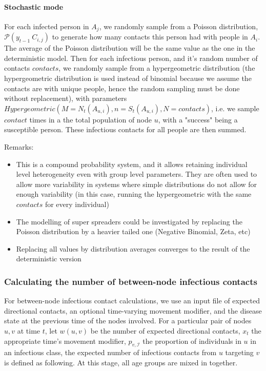 \documentclass[11pt]{article}
\begin{document}
\paragraph{Stochastic mode}\hfill \break
For each infected person in $A_j$, we randomly sample from a Poisson distribution, $\mathcal{P}(y_{t-1}~C_{i,j})$ to generate how many contacts this person had with people in $A_i$. The average of the Poisson distribution will be the same value as the one in the deterministic model. Then for each infectious person, and it's random number of contacts $contacts$, we randomly sample from a hypergeometric distribution (the hypergeometric distribution is used instead of binomial because we assume the contacts are with unique people, hence the random sampling must be done without replacement), with parameters $Hypergeometric(M=N_t(A_{u,i}), n=S_t(A_{u,i}), N=contacts)$, i.e. we sample $contact$ times in a the total population of node $u$, with a "success" being a susceptible person. These infectious contacts for all people are then summed.

Remarks:
\begin{itemize}
\item This is a compound probability system, and it allows retaining individual level heterogeneity even with group level parameters. They are often used to allow more variability in systems where simple distributions do not allow for enough variability (in this case, running the hypergeometric with the same $contacts$ for every individual)
\item The modelling of super spreaders could be investigated by replacing the Poisson distribution by a heavier tailed one (Negative Binomial, Zeta, etc)
\item Replacing all values by distribution averages converges to the result of the deterministic version
\end{itemize}

\subsubsection{Calculating the number of between-node infectious contacts}

For between-node infectious contact calculations, we use an input file of expected directional contacts, an optional time-varying movement modifier, and the disease state at the previous time of the nodes involved.  For a particular pair of nodes $u, v$ at time $t$, let $w(u, v)$ be the number of expected directional contacts, $x_t$ the appropriate time's movement modifier, $p_{v,\mathcal{I}}$ the proportion of individuals in $u$ in an infectious class, the expected number of infectious contacts from $u$ targeting $v$ is defined as following. At this stage, all age groups are mixed in together.
\end{document}
